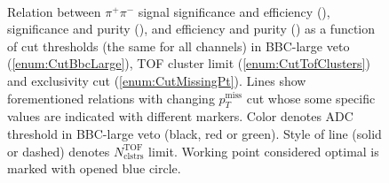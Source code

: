 \begin{figure}[b!]
{\begin{subfigure}[b]{\linewidth}
  \end{subfigure}
}%
\quad\quad%
\parbox{0.4725\textwidth}{
  \centering
  \begin{subfigure}[b]{\linewidth}\addtocounter{subfigure}{-2}
  \end{subfigure}\\
  \begin{minipage}[t][1.042\linewidth][t]{\linewidth}\vspace{10pt}
    \caption[Relation between $\pi^{+}\pi^{-}$ significance, efficiency and purity vs. thresholds in cuts~\ref{enum:CutBbcLarge}, \ref{enum:CutTofClusters} and \ref{enum:CutMissingPt}]{Relation between $\pi^{+}\pi^{-}$ signal significance and efficiency (), significance and purity (), and efficiency and purity () as a function of cut thresholds (the same for all channels) in BBC-large veto (\ref{enum:CutBbcLarge}), TOF cluster limit (\ref{enum:CutTofClusters}) and exclusivity cut (\ref{enum:CutMissingPt}). Lines show forementioned relations with changing $p_{T}^\text{miss}$ cut whose some specific values are indicated with different markers. Color denotes ADC threshold in BBC-large veto (black, red or green). Style of line (solid or dashed) denotes $N^{\text{TOF}}_{\text{clstrs}}$ limit. Working point considered optimal is marked with opened blue circle.}\label{fig:workingPoint}
  \end{minipage}
}%

\end{figure}\\
